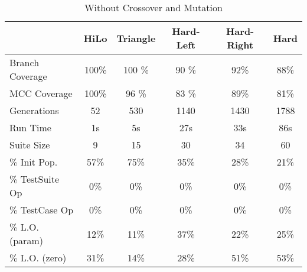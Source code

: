 \documentclass[runningheads]{llncs}
\begin{document}
\begin{table}[h!]
	\begin{center}
		\def\arraystretch{1.2}%
		\setlength\tabcolsep{1em}
		\begin{tabular}{| l | c  c  c  c c |}
			\hline
						     & HiLo  		 & Triangle		& Hard-Left	& 	Hard-Right 		& Hard		\\ \hline
			Branch Coverage	 & 100\%         & 100	\%      & 90 \%      	& 92\%          & 88\%      \\ \hline
			MCC Coverage	 & 100\%         & 96 \%        & 83 \%      	& 89\%          & 81\%      \\ \hline
			Generations		 & 52          	 & 530          & 1140       	& 1430          & 1788      \\ \hline
			Run Time		 & 1s          	 & 5s           & 27s       	& 33s          	& 86s       \\ \hhline{|=|=====|}
																
			Suite Size       & 9        	& 15       	 	& 30			& 34          	& 60        \\ \hline
			\% Init Pop.     & 57\%         & 75\%       	& 35\%       	& 28\%         	& 21\%      \\ \hline
			\% TestSuite Op  & 0\%          & 0\%       	& 0\%			& 0\%          	& 0\%       \\ \hline
			\% TestCase  Op  & 0\%          & 0\%       	& 0\%      		& 0\%         	& 0\%       \\ \hline
			\% 	L.O. (param) & 12\%         & 11\%       	& 37\%       	& 22\%          & 25\%      \\ \hline
			\% L.O. (zero)	 & 31\%         & 14\%      	& 28\%       	& 51\%          & 53\%      \\ \hline
		\end{tabular}
	\end{center}
	\caption{Without Crossover and Mutation}  
	\label{tab:noGA}
\end{table}
\end{document}
